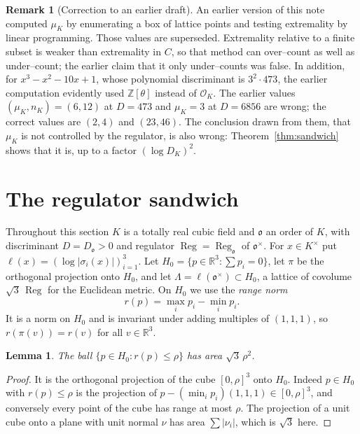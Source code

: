 \documentclass[11pt,reqno]{amsart}
\theoremstyle{plain}
\newtheorem{lemma}[theorem]{Lemma}
\theoremstyle{definition}
\newtheorem{remark}[theorem]{Remark}
\newcommand{\Z}{\mathbb{Z}}
\newcommand{\R}{\mathbb{R}}
\newcommand{\Reg}{\operatorname{Reg}}
\newcommand{\Ok}{\mathfrak{o}}
\newcommand{\nK}{n_K}
\newcommand{\muK}{\mu_K}
\begin{document}
\begin{remark}[Correction to an earlier draft]\label{rem:correction}
An earlier version of this note computed $\muK$ by enumerating a box of lattice points and testing
extremality by linear programming. Those values are superseded. Extremality relative to a finite subset is
weaker than extremality in $C$, so that method can over--count as well as under--count; the earlier claim
that it only under--counts was false. In addition, for $x^3-x^2-10x+1$, whose polynomial discriminant is
$3^2\cdot473$, the earlier computation evidently used $\Z[\theta]$ instead of $\mathcal O_K$. The earlier
values $(\muK,\nK)=(6,12)$ at $D=473$ and $\muK=3$ at $D=6856$ are wrong; the correct values are $(2,4)$ and
$(23,46)$. The conclusion drawn from them, that $\muK$ is not controlled by the regulator, is also wrong:
Theorem~\ref{thm:sandwich} shows that it is, up to a factor $(\log D_K)^2$.
\end{remark}

\section{The regulator sandwich}\label{sec:sandwich}

Throughout this section $K$ is a totally real cubic field and $\Ok$ an order of $K$, with discriminant
$D=D_\Ok>0$ and regulator $\Reg=\Reg_\Ok$ of $\Ok^\times$. For $x\in K^\times$ put
$\ell(x)=(\log|\sigma_i(x)|)_{i=1}^3$. Let $H_0=\{p\in\R^3:\sum p_i=0\}$, let $\pi$ be the orthogonal projection
onto $H_0$, and let $\Lambda=\ell(\Ok^\times)\subset H_0$, a lattice of covolume $\sqrt3\,\Reg$ for the Euclidean
metric. On $H_0$ we use the \emph{range norm}
\[
r(p)=\max_ip_i-\min_ip_i .
\]
It is a norm on $H_0$ and is invariant under adding multiples of $(1,1,1)$, so $r(\pi(v))=r(v)$ for all
$v\in\R^3$.

\begin{lemma}\label{lem:rangeball}
The ball $\{p\in H_0:r(p)\le\rho\}$ has area $\sqrt3\,\rho^2$.
\end{lemma}

\begin{proof}
It is the orthogonal projection of the cube $[0,\rho]^3$ onto $H_0$. Indeed $p\in H_0$ with $r(p)\le\rho$
is the projection of $p-(\min_ip_i)(1,1,1)\in[0,\rho]^3$, and conversely every point of the cube has range
at most $\rho$. The projection of a unit cube onto a plane with unit normal $\nu$ has area
$\sum|\nu_i|$, which is $\sqrt3$ here.
\end{proof}
\end{document}
